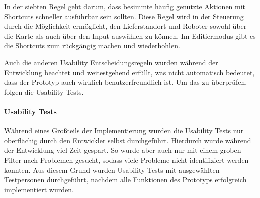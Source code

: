
In der siebten Regel geht darum, dass besimmte häufig genutzte Aktionen mit Shortcuts schneller ausführbar sein sollten. Diese Regel wird in der Steuerung durch die Möglichkeit ermöglicht, den Lieferstandort und Roboter sowohl über die Karte als auch über den Input auswählen zu können. Im Editiermodus gibt es die Shortcuts zum rückgängig machen und wiederhohlen.




Auch die anderen Usability Entscheidungsregeln wurden während der Entwicklung beachtet und weitestgehend erfüllt, was nicht automatisch bedeutet, dass der Prototyp auch wirklich benutzerfreundlich ist. Um das zu überprüfen, folgen die Usability Tests.

\paragraph{Usability Tests}\label{sec:UsabilityTests}
Während eines Großteils der Implementierung wurden die Usability Tests nur oberflächig durch den Entwickler selbst durchgeführt. Hierdurch wurde während der Entwicklung viel Zeit gespart. So wurde aber auch nur mit einem groben Filter nach Problemen gesucht, sodass viele Probleme nicht identifiziert werden konnten. Aus diesem Grund wurden Usability Tests mit ausgewählten Testpersonen durchgeführt, nachdem alle Funktionen des Prototyps erfolgreich implementiert wurden.

